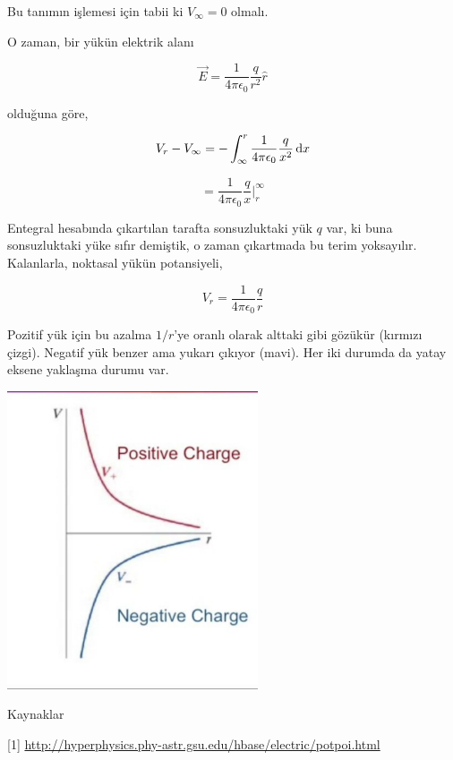 \documentclass[12pt,fleqn]{article}\usepackage{../../common}
\begin{document}
Bu tanımın işlemesi için tabii ki $V_\infty = 0$ olmalı.

O zaman, bir yükün elektrik alanı

$$
\vec{E} = \frac{1}{4\pi\epsilon_0} \frac{q}{r^2}\hat{r}
$$

olduğuna göre, 

$$
V_r - V_\infty =
-\int _{\infty}^{r}  \frac{1}{4\pi\epsilon_0} \frac{q}{x^2} \,\mathrm{d} x
$$

$$
= \frac{1}{4\pi\epsilon_0} \frac{q}{x} \bigg| _{r}^{\infty} 
$$

Entegral hesabında çıkartılan tarafta sonsuzluktaki yük $q$ var, ki buna
sonsuzluktaki yüke sıfır demiştik, o zaman çıkartmada bu terim
yoksayılır. Kalanlarla, noktasal yükün potansiyeli,

$$
V_r = \frac{1}{4\pi\epsilon_0} \frac{q}{r}
$$

Pozitif yük için bu azalma $1/r$'ye oranlı olarak alttaki gibi gözükür (kırmızı
çizgi). Negatif yük benzer ama yukarı çıkıyor (mavi). Her iki durumda da yatay
eksene yaklaşma durumu var.

\includegraphics[width=20em]{10_01.jpg}

Kaynaklar

[1] \url{http://hyperphysics.phy-astr.gsu.edu/hbase/electric/potpoi.html}
\end{document}
